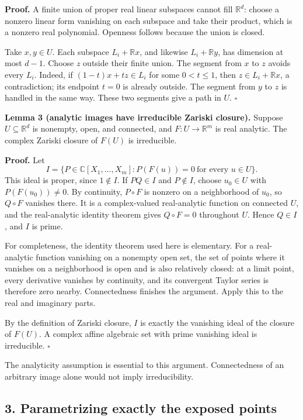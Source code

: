 \documentclass[
  11pt,
  letterpaper,
]{article}
\begin{document}
\textbf{Proof.} A finite union of proper real linear subspaces cannot
fill \(\mathbb R^d\): choose a nonzero linear form vanishing on each
subspace and take their product, which is a nonzero real polynomial.
Openness follows because the union is closed.

Take \(x,y\in U\). Each subspace \(L_i+\mathbb Rx\), and likewise
\(L_i+\mathbb Ry\), has dimension at most \(d-1\). Choose \(z\) outside
their finite union. The segment from \(x\) to \(z\) avoids every
\(L_i\). Indeed, if \((1-t)x+tz\in L_i\) for some \(0<t\leq1\), then
\(z\in L_i+\mathbb Rx\), a contradiction; its endpoint \(t=0\) is
already outside. The segment from \(y\) to \(z\) is handled in the same
way. These two segments give a path in \(U\). \(\square\)

\textbf{Lemma 3 (analytic images have irreducible Zariski closure).}
Suppose \(U\subseteq\mathbb R^d\) is nonempty, open, and connected, and
\(F:U\to\mathbb R^m\) is real analytic. The complex Zariski closure of
\(F(U)\) is irreducible.

\textbf{Proof.} Let \[
I=\{P\in\mathbb C[X_1,\ldots,X_m]:P(F(u))=0\ \text{for every }u\in U\}.
\] This ideal is proper, since \(1\notin I\). If \(PQ\in I\) and
\(P\notin I\), choose \(u_0\in U\) with \(P(F(u_0))\ne0\). By
continuity, \(P\circ F\) is nonzero on a neighborhood of \(u_0\), so
\(Q\circ F\) vanishes there. It is a complex-valued real-analytic
function on connected \(U\), and the real-analytic identity theorem
gives \(Q\circ F=0\) throughout \(U\). Hence \(Q\in I\), and \(I\) is
prime.

For completeness, the identity theorem used here is elementary. For a
real-analytic function vanishing on a nonempty open set, the set of
points where it vanishes on a neighborhood is open and is also
relatively closed: at a limit point, every derivative vanishes by
continuity, and its convergent Taylor series is therefore zero nearby.
Connectedness finishes the argument. Apply this to the real and
imaginary parts.

By the definition of Zariski closure, \(I\) is exactly the vanishing
ideal of the closure of \(F(U)\). A complex affine algebraic set with
prime vanishing ideal is irreducible. \(\square\)

The analyticity assumption is essential to this argument. Connectedness
of an arbitrary image alone would not imply irreducibility.

\subsection{3. Parametrizing exactly the exposed
points}\label{parametrizing-exactly-the-exposed-points}
\end{document}

